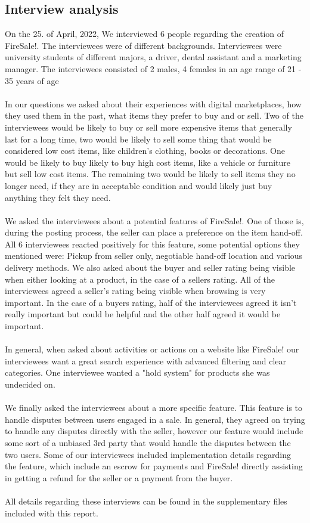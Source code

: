 \subsection{Interview analysis}
On the 25. of April, 2022, We interviewed 6 people regarding the creation of FireSale!. The interviewees were of different backgrounds. Interviewees were university students of different majors, a driver, dental assistant and a marketing manager. The interviewees consisted of 2 males, 4 females in an age range of 21 - 35 years of age\\\\
In our questions we asked about their experiences with digital marketplaces, how they used them in the past, what items they prefer to buy and or sell. Two of the interviewees would be likely to buy or sell more expensive items that generally last for a long time, two would be likely to sell some thing that would be considered low cost items, like children's clothing, books or decorations. One would be likely to buy likely to buy high cost items, like a vehicle or furniture but sell low cost items. The remaining two would be likely to sell items they no longer need, if they are in acceptable condition and would likely just buy anything they felt they need.\\\\
We asked the interviewees about a potential features of FireSale!. One of those is, during the posting process, the seller can place a preference on the item hand-off. 
All 6 interviewees reacted positively for this feature, some potential options they mentioned were: Pickup from seller only, negotiable hand-off location and various delivery methods. We also asked about the buyer and seller rating being visible when either looking at a product, in the case of a sellers rating. 
All of the interviewees agreed a seller's rating being visible when browsing is very important. In the case of a buyers rating, half of the interviewees agreed it isn't really important but could be helpful and the other half agreed it would be important. \\\\
In general, when asked about activities or actions on a website like FireSale! our interviewees want a great search experience with advanced filtering and clear categories. One interviewee wanted a "hold system" for products she was undecided on.\\\\
We finally asked the interviewees about a more specific feature. This feature is to handle disputes between users engaged in a sale. In general, they agreed on trying to handle any disputes directly with the seller, however our feature would include some sort of a unbiased 3rd party that would handle the disputes between the two users. Some of our interviewees included implementation details regarding the feature, which include an escrow for payments and FireSale! directly assisting in getting a refund for the seller or a payment from the buyer.\\\\
All details regarding these interviews can be found in the supplementary files included with this report.
